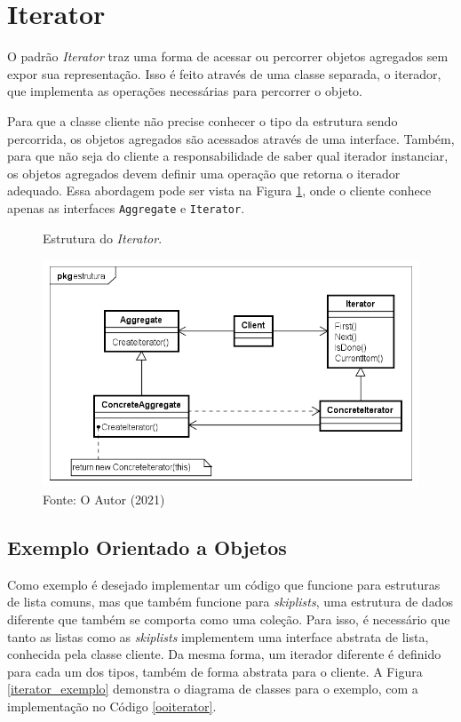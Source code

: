 \section{Iterator}

O padrão \textit{Iterator} traz uma forma de acessar ou 
percorrer objetos agregados sem expor sua representação. 
Isso é feito através de uma classe separada, o iterador, 
que implementa as operações necessárias para percorrer 
o objeto. \cite{gamma:1995}

Para que a classe cliente não precise conhecer o tipo 
da estrutura sendo percorrida, os objetos agregados 
são acessados através de uma interface. Também, para 
que não seja do cliente a responsabilidade de saber 
qual iterador instanciar, os objetos agregados devem 
definir uma operação que retorna o iterador adequado. 
Essa abordagem pode ser vista na Figura \ref{iterator_struct}, 
onde o cliente conhece apenas as interfaces 
\texttt{Aggregate} e \texttt{Iterator}.

\begin{figure}[htb]
	\caption{\label{iterator_struct}Estrutura do \textit{Iterator}.}
	\begin{center}
	    \includegraphics[scale=0.5]{5_padroes-contexto-funcional/5.3_comportamentais/5.3.04_iterator/iterator_struct.png}
	\end{center}
  \caption*{Fonte: O Autor (2021)}
\end{figure}

\subsection*{Exemplo Orientado a Objetos}

Como exemplo é desejado implementar um código 
que funcione para estruturas de lista comuns, mas 
que também funcione para \textit{skiplists}, uma 
estrutura de dados diferente que também se comporta 
como uma coleção. Para isso, é necessário que 
tanto as listas como as \textit{skiplists} implementem 
uma interface abstrata de lista, conhecida pela 
classe cliente. Da mesma forma, um iterador diferente 
é definido para cada um dos tipos, também de forma 
abstrata para o cliente. A Figura \ref{iterator_exemplo} 
demonstra o diagrama de classes para o exemplo, com a 
implementação no Código \ref{ooiterator}.

